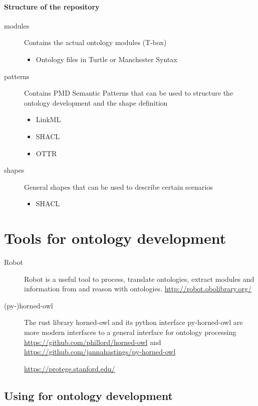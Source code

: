 \paragraph{Structure of the repository}

\begin{description}
    \item[modules] Contains the actual ontology modules (T-box)
    \begin{itemize}
        \item Ontology files in Turtle or Manchester Syntax
    \end{itemize}
    \item[patterns] Contains PMD Semantic Patterns that can be used to structure the ontology development and the shape definition
    \begin{itemize}
        \item LinkML
        \item SHACL
        \item OTTR
    \end{itemize}
    \item[shapes] General shapes that can be used to describe certain scenarios
    \begin{itemize}
        \item SHACL
    \end{itemize}
\end{description}

\section{Tools for ontology development}

\begin{description}
    \item[Robot] Robot is a useful tool to process, translate ontologies, extract modules and information from and reason with ontologies. \url{http://robot.obolibrary.org/}
    \item[(py-)horned-owl] The rust library horned-owl and its python interface py-horned-owl are more modern interfaces to a general interface for ontology processing \url{https://github.com/phillord/horned-owl} and \url{https://github.com/jannahastings/py-horned-owl}
    \item[{\protege}] \url{https://protege.stanford.edu/}
\end{description}

\subsection{Using {\protege} for ontology development}

